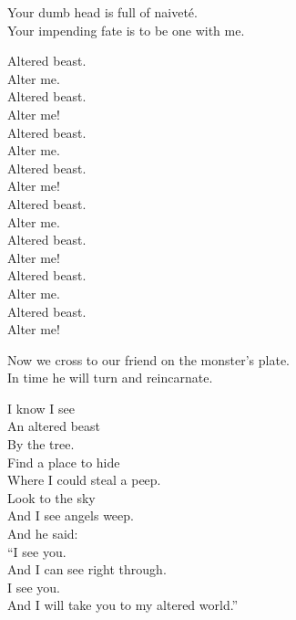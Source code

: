 

Your dumb  head is full of naiveté. \\
Your impending fate is to be one with me. \\


Altered beast. \\
Alter me. \\
Altered beast. \\
Alter me! \\

Altered beast. \\
Alter me. \\
Altered beast. \\
Alter me! \\

Altered beast. \\
Alter me. \\
Altered beast. \\
Alter me! \\

Altered beast. \\
Alter me. \\
Altered beast. \\
Alter me! \\


Now we cross to our friend on the monster's plate. \\
In time he will turn and reincarnate. \\





I know I see \\
An altered beast \\
By the tree. \\

Find a place to hide \\
Where I could steal a peep. \\
Look to the sky \\
And I see angels weep. \\

And he said: \\
``I see you. \\
And I can see right through. \\
I see you. \\
And I will take you to my altered world.'' \\

